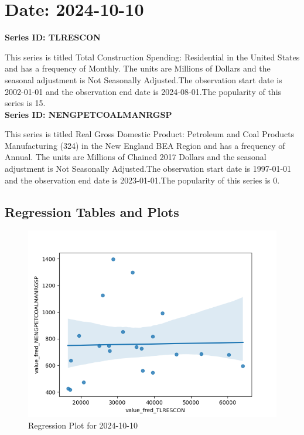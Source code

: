 \section{Date: 2024-10-10}
\noindent \textbf{Series ID: TLRESCON} 

\noindent This series is titled Total Construction Spending: Residential in the United States and has a frequency of Monthly. The units are Millions of Dollars and the seasonal adjustment is Not Seasonally Adjusted.The observation start date is 2002-01-01 and the observation end date is 2024-08-01.The popularity of this series is 15. \\ 

\noindent \textbf{Series ID: NENGPETCOALMANRGSP} 

\noindent This series is titled Real Gross Domestic Product: Petroleum and Coal Products Manufacturing (324) in the New England BEA Region and has a frequency of Annual. The units are Millions of Chained 2017 Dollars and the seasonal adjustment is Not Seasonally Adjusted.The observation start date is 1997-01-01 and the observation end date is 2023-01-01.The popularity of this series is 0. \\ 

\subsection{Regression Tables and Plots}


\begin{figure}
\centering
\includegraphics[scale = 0.9]{plots/plot_2024-10-10.png}
\caption{Regression Plot for 2024-10-10}
\end{figure}
\newpage
